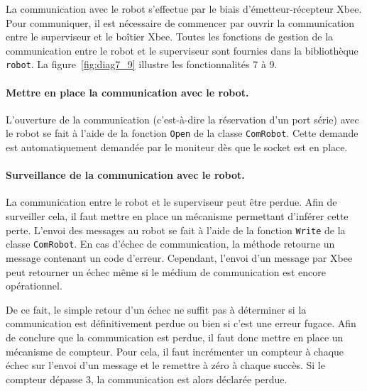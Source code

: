 La communication avec le robot s'effectue par le biais d'émetteur-récepteur Xbee. Pour communiquer, il est nécessaire de commencer par ouvrir la communication entre le superviseur et le boîtier Xbee. Toutes les fonctions de gestion de la communication entre le robot et le superviseur sont fournies dans la bibliothèque {\tt robot}. La figure~\ref{fig:diag7_9} illustre les fonctionnalités 7 à 9.

\paragraph{Mettre en place la communication avec le robot.} L'ouverture de la communication (c'est-à-dire la réservation d'un port série) avec le robot se fait à l'aide de la fonction {\tt Open} de la classe {\tt ComRobot}. Cette demande est automatiquement demandée par le moniteur dès que le socket est en place.\\


\paragraph{Surveillance de la communication avec le robot.} La communication entre le robot et le superviseur peut être perdue. Afin de surveiller cela, il faut mettre en place un mécanisme permettant d'inférer cette perte. L'envoi des messages au robot se fait à l'aide de la fonction {\tt Write} de la classe {\tt ComRobot}. En cas d'échec de communication, la méthode retourne un message contenant un code d'erreur. Cependant, l'envoi d'un message par Xbee peut retourner un échec même si le médium de communication est encore opérationnel.

De ce fait, le simple retour d'un échec ne suffit pas à déterminer si la communication est définitivement perdue ou bien si c'est une erreur fugace. Afin de conclure que la communication est perdue, il faut donc mettre en place un mécanisme de compteur. Pour cela, il faut incrémenter un compteur à chaque échec sur l'envoi d'un message et le remettre à zéro à chaque succès. Si le compteur dépasse 3, la communication est alors déclarée perdue.\\


